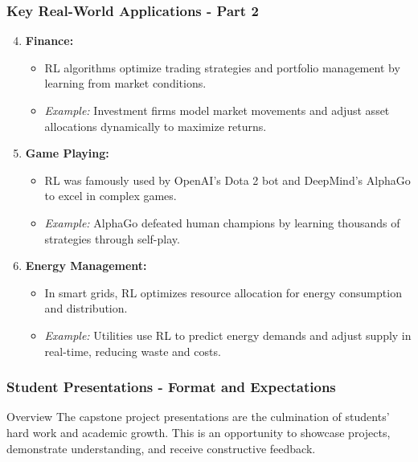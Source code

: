 \documentclass[aspectratio=169]{beamer}
\begin{document}
\begin{frame}[fragile]
    \frametitle{Key Real-World Applications - Part 2}

    \begin{enumerate}
        \setcounter{enumi}{3} %
        \item \textbf{Finance:}
        \begin{itemize}
            \item RL algorithms optimize trading strategies and portfolio management by learning from market conditions.
            \item \textit{Example:} Investment firms model market movements and adjust asset allocations dynamically to maximize returns.
        \end{itemize}

        \item \textbf{Game Playing:}
        \begin{itemize}
            \item RL was famously used by OpenAI’s Dota 2 bot and DeepMind’s AlphaGo to excel in complex games.
            \item \textit{Example:} AlphaGo defeated human champions by learning thousands of strategies through self-play.
        \end{itemize}

        \item \textbf{Energy Management:}
        \begin{itemize}
            \item In smart grids, RL optimizes resource allocation for energy consumption and distribution.
            \item \textit{Example:} Utilities use RL to predict energy demands and adjust supply in real-time, reducing waste and costs.
        \end{itemize}
    \end{enumerate}
\end{frame}

\begin{frame}[fragile]
    \frametitle{Student Presentations - Format and Expectations}
    \begin{block}{Overview}
        The capstone project presentations are the culmination of students' hard work and academic growth. 
        This is an opportunity to showcase projects, demonstrate understanding, and receive constructive feedback.
    \end{block}
\end{frame}
\end{document}
